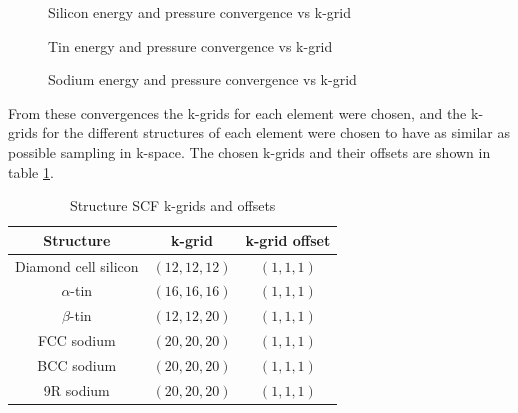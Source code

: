 \documentclass[12pt]{article}
\begin{document}
\begin{figure}
	\centering
	\subfloat{
		
}\qquad
\subfloat{
		
}\qquad
\caption{Silicon energy and pressure convergence vs k-grid}
\label{fig:silicon_k_convergence}
\end{figure}
\begin{figure}
	\centering
	\subfloat{
		
}\qquad
\subfloat{
		
}\qquad
\caption{Tin energy and pressure convergence vs k-grid}
\label{fig:tin_k_convergence}
\end{figure}
\begin{figure}
	\centering
	\subfloat{
		
}\qquad
\subfloat{
		
}\qquad
\caption{Sodium energy and pressure convergence vs k-grid}
\label{fig:sodium_k_convergence}
\end{figure}

From these convergences the k-grids for each element were chosen, and the k-grids for the different structures of each element were chosen to have as similar as possible sampling in k-space. The chosen k-grids and their offsets are shown in table \ref{tab:k-grids}.

\begin{table}
	\centering
	\begin{tabular}{|c|c|c|}
		\hline
		Structure & k-grid & k-grid offset \\
		\hline
		Diamond cell silicon & $(12, 12, 12)$ & $(1, 1, 1)$ \\
		$\alpha$-tin & $(16, 16, 16)$ & $(1, 1, 1)$ \\
		$\beta$-tin & $(12, 12, 20)$ & $(1, 1, 1)$ \\
		FCC sodium & $(20, 20, 20)$ & $(1, 1, 1)$ \\
		BCC sodium & $(20, 20, 20)$ & $(1, 1, 1)$ \\
		9R sodium & $(20, 20, 20)$ & $(1, 1, 1)$ \\
		\hline
	\end{tabular}
	\caption{Structure SCF k-grids and offsets}
	\label{tab:k-grids}
\end{table}
\end{document}
